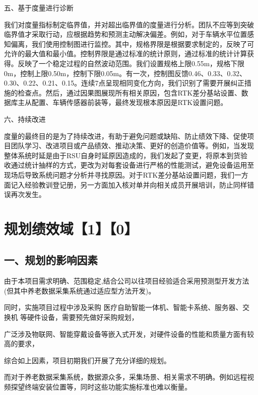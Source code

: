 \documentclass[UTF8]{../computerUniverse}
\begin{document}
五、基于度量进行诊断

我们对度量指标制定临界值，并对超出临界值的度量进行分析。团队不应等到突破临界值才采取行动，应根据趋势和预测主动解决偏差。例如，对于车辆水平位置感知偏离，我们使用控制图进行监控。其中，规格界限是根据要求制定的，反映了可允许的最大值和最小值。控制界限是通过标准的统计原则，通过标准的统计计算获得。反映了一个稳定过程的自然波动范围。我们设置规格上限0.55m，规格下限0m，控制上限0.50m，控制下限0.05m。有一次，控制图反馈0.46、0.33、0.32、0.30、0.22、0.21、0.15。连续7点呈现相同变化方向，我们识别了需要开展纠正措施的检查点。然后，通过因果图展现所有相关原因，包含RTK差分基站设置、数据库主从配置、车辆传感器前装等，最终发现根本原因是RTK设置问题。



六、持续改进

度量的最终目的是为了持续改进，有助于避免问题或缺陷、防止绩效下降、促使项目团队学习、改进项目或产品绩效、推动决策、更好的创造价值等。例如，当发现整体系统时延是由于RSU自身时延原因造成的，我们发起了变更，将原本到货验收通过统计抽样的方式，更改为对每套设备进行严格的性能测试，避免设备运用至现场后导致系统问题才分析并寻找原因。对于RTK差分基站设置问题，我们一方面记入经验教训登记册，另一方面加入核对单并向相关成员开展培训，防止同样错误再次发生。







\chapter{规划绩效域【1】【0】}

\section{一、规划的影响因素}


由于本项目需求明确、范围稳定,结合公司以往项目经验适合采用预测型开发方法(但其中养老数据采集系统通过适应型方法开发)。

同时，实施项目过程中涉及采购
医疗自助智能一体机、智能卡系统、服务器、交换机
等硬件设备，需要预先做好采购规划，

广泛涉及物联网、智能穿戴设备等嵌入式开发，对硬件设备的性能和质量方面有较高的要求，

综合如上因素，项目初期我们开展了充分详细的规划。

而对于养老数据采集系统，数据源众多，采集场景、相关需求不明确。例如远程视频探望终端安装位置等，同时这些功能实施标准也难以衡量。
\end{document}
